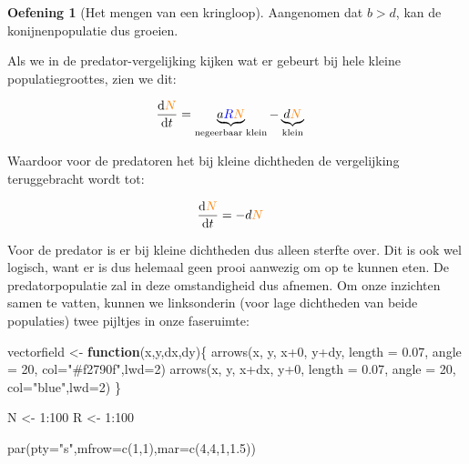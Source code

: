 \documentclass[
  a4paper,
]{scrbook}
\newenvironment{Shaded}{\begin{snugshade}}{\end{snugshade}}
\newcommand{\AttributeTok}[1]{\textcolor[rgb]{0.40,0.45,0.13}{#1}}
\newcommand{\ControlFlowTok}[1]{\textcolor[rgb]{0.00,0.23,0.31}{\textbf{#1}}}
\newcommand{\DecValTok}[1]{\textcolor[rgb]{0.68,0.00,0.00}{#1}}
\newcommand{\FloatTok}[1]{\textcolor[rgb]{0.68,0.00,0.00}{#1}}
\newcommand{\FunctionTok}[1]{\textcolor[rgb]{0.28,0.35,0.67}{#1}}
\newcommand{\NormalTok}[1]{\textcolor[rgb]{0.00,0.23,0.31}{#1}}
\newcommand{\OtherTok}[1]{\textcolor[rgb]{0.00,0.23,0.31}{#1}}
\newcommand{\SpecialCharTok}[1]{\textcolor[rgb]{0.37,0.37,0.37}{#1}}
\newcommand{\StringTok}[1]{\textcolor[rgb]{0.13,0.47,0.30}{#1}}
\theoremstyle{definition}
\newtheorem{exercise}{Oefening}[chapter]
\theoremstyle{remark}
\begin{document}
\begin{exercise}[Het mengen van een
kringloop]
Aangenomen dat \(b>d\), kan de konijnenpopulatie dus groeien.

Als we in de predator-vergelijking kijken wat er gebeurt bij hele kleine
populatiegroottes, zien we dit:

\begin{align*}
\frac{\mathrm{d}\color{orange}N}{\mathrm{d}t} &=
    \underbrace{a\color{blue}R\color{orange}N\color{black}}_{\text{negeerbaar klein}} -
    \underbrace{d\color{orange}N\color{black}}_{\text{klein}}
\end{align*}

Waardoor voor de predatoren het bij kleine dichtheden de vergelijking
teruggebracht wordt tot:

\begin{align*}
\frac{\mathrm{d}\color{orange}N\color{black}}{\mathrm{d}t} &= -d\color{orange}N
\end{align*}

Voor de predator is er bij kleine dichtheden dus alleen sterfte over.
Dit is ook wel logisch, want er is dus helemaal geen prooi aanwezig om
op te kunnen eten. De predatorpopulatie zal in deze omstandigheid dus
afnemen. Om onze inzichten samen te vatten, kunnen we linksonderin (voor
lage dichtheden van beide populaties) twee pijltjes in onze faseruimte:

\begin{Shaded}
\begin{Highlighting}[]
\NormalTok{vectorfield }\OtherTok{\textless{}{-}} \ControlFlowTok{function}\NormalTok{(x,y,dx,dy)\{}
  \FunctionTok{arrows}\NormalTok{(x, y, x}\SpecialCharTok{+}\DecValTok{0}\NormalTok{, y}\SpecialCharTok{+}\NormalTok{dy, }\AttributeTok{length =} \FloatTok{0.07}\NormalTok{, }\AttributeTok{angle =} \DecValTok{20}\NormalTok{, }\AttributeTok{col=}\StringTok{"\#f2790f"}\NormalTok{,}\AttributeTok{lwd=}\DecValTok{2}\NormalTok{)}
  \FunctionTok{arrows}\NormalTok{(x, y, x}\SpecialCharTok{+}\NormalTok{dx, y}\SpecialCharTok{+}\DecValTok{0}\NormalTok{, }\AttributeTok{length =} \FloatTok{0.07}\NormalTok{, }\AttributeTok{angle =} \DecValTok{20}\NormalTok{, }\AttributeTok{col=}\StringTok{"blue"}\NormalTok{,}\AttributeTok{lwd=}\DecValTok{2}\NormalTok{)}
\NormalTok{\}}

\NormalTok{N }\OtherTok{\textless{}{-}} \DecValTok{1}\SpecialCharTok{:}\DecValTok{100}
\NormalTok{R }\OtherTok{\textless{}{-}} \DecValTok{1}\SpecialCharTok{:}\DecValTok{100}

\FunctionTok{par}\NormalTok{(}\AttributeTok{pty=}\StringTok{"s"}\NormalTok{,}\AttributeTok{mfrow=}\FunctionTok{c}\NormalTok{(}\DecValTok{1}\NormalTok{,}\DecValTok{1}\NormalTok{),}\AttributeTok{mar=}\FunctionTok{c}\NormalTok{(}\DecValTok{4}\NormalTok{,}\DecValTok{4}\NormalTok{,}\DecValTok{1}\NormalTok{,}\FloatTok{1.5}\NormalTok{))}


\end{Highlighting}
\end{Shaded}
\end{exercise}
\end{document}
